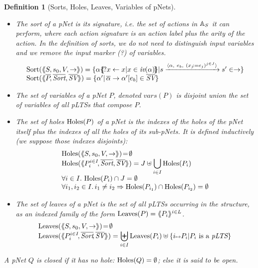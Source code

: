 \documentclass{lmcs}
\newtheorem{definition}{Definition}
\begin{document}
\begin{definition}[Sorts, Holes, Leaves, Variables of pNets]\label{def-sortholeleave}~~

  \begin{itemize}
  \item The sort of a pNet is its signature, i.e. the set of actions in $\mathbb{A}_S$ it can
perform, where each action signature is an action 
label plus the arity of the action. In the definition of sorts, we do not need to 
distinguish
input variables and we remove the
\emph{input marker} (?) of variables.
\[
\begin{array}{l}
\Sortop(\mylangle S,s_0,V, \to\myrangle) = \{\alpha\subst{?x \gets x| 
x\in\symb{iv}(\alpha)}|s \xrightarrow{\langle \alpha,~e_b,~(x_j\!:= {e}_j)^{j\in
    J}\rangle} s'\in \to \} \\
\Sortop(\mylangle \set{\pNet}\!, %
\set{\Sort},
\set{\symb{SV}}\myrangle)
=\{\alpha' |\, \SV{\set{\alpha}}{\alpha'}{e_b}\in\set{\symb{SV}}\}
\end{array}
\]

\item The set of variables of a pNet $P$, denoted $vars(P)$ is disjoint union the set of variables of  all pLTSs that compose $P$.

\item
The set of holes $\operatorname{Holes}(P)$ of a pNet is the indexes of the holes of the pNet 
itself plus the indexes of all the holes of its sub-pNets.
It is defined inductively (we suppose those indexes 
disjoints):
  \[\begin{array}{l}
\Holes(\mylangle S,s_0,V, \to\myrangle) \!=\! \emptyset\\
\Holes(\mylangle \pNet_i^{i\in I}\!,\set{\Sort}, \set{\symb{SV}}\myrangle) 
=J\uplus{\displaystyle \bigcup_{i\in 
I}\Holes(\pNet_i)}\\
\forall i\in I.\, \Holes(\pNet_i)\cap J=\emptyset\\
\forall i_1,i_2\in I.\,i_1\neq i_2\Rightarrow  \Holes(\pNet_{i_1})\cap\Holes(\pNet_{i_2})=\emptyset
\end{array}\]
\item
The set of leaves of a pNet is the set of all pLTSs occurring in the structure, as an 
indexed family of the form $\operatorname{Leaves}(P)= \langle\hspace{-0.58ex}\langle P_i \rangle\hspace{-0.58ex}\rangle^{i \in L}$.
\[\begin{array}{l}
\Leaves(\mylangle S,s_0,V, \to\myrangle) \!=\!\emptyset\\%
\Leaves(\mylangle \pNet_i^{i\in I}\!,%
\set{\Sort}\!, \set{\symb{SV}}\myrangle) = {\displaystyle \biguplus_{i\in 
I}\Leaves(\pNet_i)\uplus\{i\mapsto \pNet_i|\pNet_i \text{ is a }\pLTS\}}
\end{array}\]
\end{itemize}

A pNet $Q$ is \emph{closed} if it has no hole: $\operatorname{Holes}(Q)=\emptyset$; else it
is said to be \emph{open}.
\end{definition}
  
\end{document}
